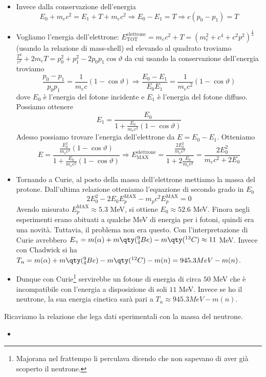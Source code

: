   \begin{itemize}
  \item Invece dalla conservazione dell'energia
  \begin{equation*}
      E_0+m_ec^2=E_1+T+m_ec^2\Rightarrow E_0-E_1=T\Rightarrow c(p_0-p_1)=T
  \end{equation*}
  \item Vogliamo l'energia dell'elettrone: $E_{\text{TOT}}^{\text{elettrone}}=m_ec^2+T=(m_e^2+c^4+c^2p^2)^{\frac12}$ (usando la relazione di mass-shell) ed elevando al quadrato troviamo $\frac{T^2}{c^2}+2m_eT=p_0^2+p_1^2-2p_0p_1\cos\vartheta$ da cui usando la conservazione dell'energia troviamo
  \begin{equation*}
    \frac{p_0-p_1}{p_0p_1}=\frac1{m_ec}(1-\cos\vartheta)\Rightarrow \frac{E_0-E_1}{E_0E_1}=\frac1{m_ec^2}(1-\cos\vartheta)
  \end{equation*}
  dove $E_0$ è l'energia del fotone incidente e $E_1$ è l'energia del fotone diffuso. Possiamo ottenere 
  \begin{equation*}
    E_1 = \frac{E_0}{1+\frac{E_0}{m_ec^2}(1-\cos\vartheta)}
  \end{equation*}
Adesso possiamo trovare l'energia dell'elettrone da $E=E_0-E_1$. Otteniamo
\begin{equation*}
    E=\frac{\frac{E_0^2}{m_ec^2}(1-\cos\vartheta)}{1+\frac{E_0}{m_ec^2}(1-\cos\vartheta)}\Rightarrow E_{\text{MAX}}^{\text{elettrone}}=\frac{\frac{2E_0^2}{m_ec^2}}{1+2\frac{E_0}{m_ec^2}}=\frac{2E_0^2}{m_ec^2+2E_0}
\end{equation*}
    \item Tornando a Curie, al posto della massa dell'elettrone mettiamo la massa del protone. Dall'ultima relazione otteniamo l'equazione di secondo grado in $E_0$
    \begin{equation*}
        2E_0^2-2E_0E_p^{\text{MAX}}-m_pc^2E_p^{\text{MAX}}=0
    \end{equation*}
    Avendo misurato $E_p^{\text{MAX}}\approx 5.3$ MeV, si ottiene $E_0\approx 52.6$ MeV. Finora negli esperimenti erano abituati a qualche MeV di energia per i fotoni, quindi era una novità. Tuttavia, il problema non era questo. Con l'interpretazione di Curie avrebbero $E_\gamma=m(\alpha)+m\qty(^9_4Be)-m\qty(^{13}C)\approx 11$ MeV. Invece con Chadwick si ha $T_n=m(\alpha)+m\qty(^9_4Be)-m\qty(^{12}C)- m(n)=945.3 MeV - m(n)$.
\item Dunque con Curie\footnote{Majorana nel frattempo li perculava dicendo che non sapevano di aver già scoperto il neutrone.} servirebbe un fotone di energia di circa $50$ MeV che è incompatibile con l'energia a disposizione di soli $11$ MeV. Invece se ho il neutrone, la sua energia cinetica sarà pari a $T_n\approx 945.3 MeV - m(n)$.
\end{itemize}
Ricaviamo la relazione che lega dati sperimentali con la massa del neutrone.
\begin{itemize}
    \item 
\end{itemize}
